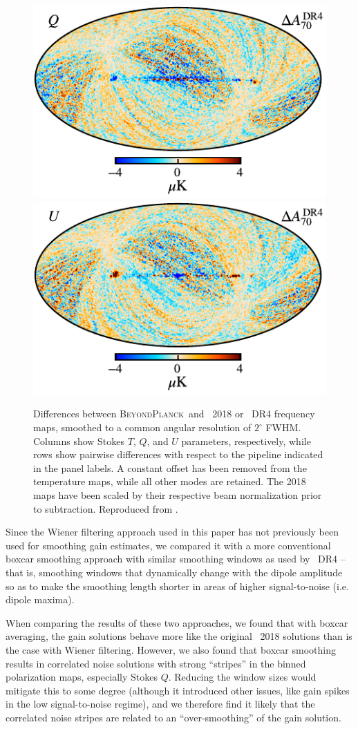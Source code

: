 \documentclass[twocolumn]{aa}
\newcommand{\BP}{\textsc{BeyondPlanck}}
\begin{document}
\begin{figure}[p]
  \includegraphics[width=0.27\linewidth]{figs/BP_070_diff_npipe_v2_Q_DIFF_w8_n1024_cb_c-planck.pdf}
  \includegraphics[width=0.27\linewidth]{figs/BP_070_diff_npipe_v2_U_DIFF_w8_n1024_cb_c-planck.pdf}\\
  \caption{Differences between \BP\ and \Planck\ 2018 or \Planck\ DR4 frequency
    maps, smoothed to a common angular resolution of $2^{\circ}$
    FWHM. Columns show Stokes $T$, $Q$, and $U$ parameters,
    respectively, while rows show pairwise differences with respect
    to the pipeline indicated in the panel labels. A constant offset
    has been removed from the temperature maps, while all other modes
    are retained. The 2018 maps have been scaled by their respective
    beam normalization prior to subtraction. Reproduced from \citet{bp10}.
  }\label{fig:freqdiff}

\end{figure}


Since the Wiener filtering approach used in this paper has not previously been used for smoothing gain estimates, we compared it with a more conventional boxcar smoothing approach with similar smoothing windows as used by \Planck\ DR4 -- that is, smoothing windows that dynamically change with the dipole amplitude so as to make the smoothing length shorter in areas of higher signal-to-noise (i.e. dipole maxima).

When comparing the results of these two approaches, we found that with boxcar averaging, the gain solutions behave more like the original \Planck\ 2018 solutions than is the case with Wiener filtering. However, we also found that boxcar smoothing results in correlated noise solutions with strong ``stripes'' in the binned polarization maps, especially Stokes $Q$. Reducing the window sizes would mitigate this to some degree (although it introduced other issues, like gain spikes in the low signal-to-noise regime), and we therefore find it likely that the correlated noise stripes are related to an ``over-smoothing'' of the gain solution.
\end{document}

